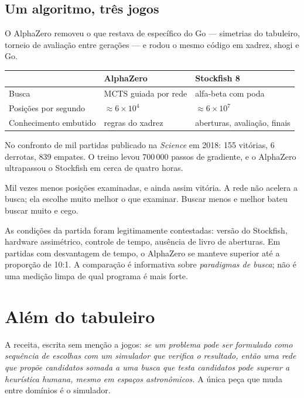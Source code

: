 \documentclass[11pt]{article}
\begin{document}
\subsection{Um algoritmo, três jogos}

O AlphaZero removeu o que restava de específico do Go — simetrias do tabuleiro,
torneio de avaliação entre gerações — e rodou o mesmo código em xadrez, shogi e Go.

\begin{center}
\begin{tabular}{lll}
\toprule
 & \textbf{AlphaZero} & \textbf{Stockfish 8} \\
\midrule
Busca & MCTS guiada por rede & alfa-beta com poda \\
Posições por segundo & $\approx 6\times10^{4}$ & $\approx 6\times10^{7}$ \\
Conhecimento embutido & regras do xadrez & aberturas, avaliação, finais \\
\bottomrule
\end{tabular}
\end{center}

No confronto de mil partidas publicado na \emph{Science} em 2018: 155 vitórias,
6 derrotas, 839 empates. O treino levou 700\,000 passos de gradiente, e o
AlphaZero ultrapassou o Stockfish em cerca de quatro horas.

Mil vezes menos posições examinadas, e ainda assim vitória. A rede não acelera a
busca; ela escolhe muito melhor o que examinar. Buscar menos e melhor bateu buscar
muito e cego.

\begin{alertabox}
As condições da partida foram legitimamente contestadas: versão do Stockfish,
hardware assimétrico, controle de tempo, ausência de livro de aberturas. Em
partidas com desvantagem de tempo, o AlphaZero se manteve superior até a proporção
de 10:1. A comparação é informativa sobre \emph{paradigmas de busca}; não é uma
medição limpa de qual programa é mais forte.
\end{alertabox}

\section{Além do tabuleiro}

A receita, escrita sem menção a jogos: \emph{se um problema pode ser formulado
como sequência de escolhas com um simulador que verifica o resultado, então uma
rede que propõe candidatos somada a uma busca que testa candidatos pode superar a
heurística humana, mesmo em espaços astronômicos.} A única peça que muda entre
domínios é o simulador.
\end{document}
